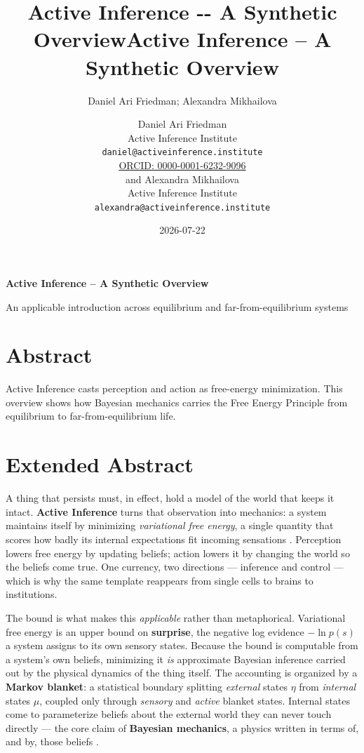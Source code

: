 \documentclass[
  english,
]{article}
\title{Active Inference -\/- A Synthetic Overview}
\author{Daniel Ari Friedman; Alexandra Mikhailova}
\date{}
\title{Active Inference -- A Synthetic Overview}
\author{Daniel Ari Friedman\\\footnotesize{Active Inference Institute}\\\footnotesize{\texttt{daniel@activeinference.institute}}\\\footnotesize{\href{https://orcid.org/0000-0001-6232-9096}{ORCID: 0000-0001-6232-9096}} \\and Alexandra Mikhailova\\\footnotesize{Active Inference Institute}\\\footnotesize{\texttt{alexandra@activeinference.institute}}}
\date{2026-07-22}
\begin{document}
\begin{titlepage}
\centering
\vspace*{2cm}
{\LARGE\bfseries Active Inference -- A Synthetic Overview\par}
\vspace{0.75em}
{\large An applicable introduction across equilibrium and far-from-equilibrium systems\par}
\vfill
\makeatletter
{\@author\par}
\vspace{1em}
{\@date\par}
\makeatother
\vfill
\end{titlepage}
\thispagestyle{empty}
\tableofcontents
\newpage

\section{Abstract}\label{sec:abstract}

Active Inference casts perception and action as free-energy
minimization. This overview shows how Bayesian mechanics carries the
Free Energy Principle from equilibrium to far-from-equilibrium life.

\newpage

\section{Extended Abstract}\label{sec:extended}

A thing that persists must, in effect, hold a model of the world that
keeps it intact. \textbf{Active Inference} turns that observation into
mechanics: a system maintains itself by minimizing \emph{variational
free energy}, a single quantity that scores how badly its internal
expectations fit incoming sensations
\citep{friston2010fep, parr2022active}. Perception lowers free energy by
updating beliefs; action lowers it by changing the world so the beliefs
come true. One currency, two directions --- inference and control ---
which is why the same template reappears from single cells to brains to
institutions.

The bound is what makes this \emph{applicable} rather than metaphorical.
Variational free energy is an upper bound on \textbf{surprise}, the
negative log evidence \(-\ln p(s)\) a system assigns to its own sensory
states. Because the bound is computable from a system's own beliefs,
minimizing it \emph{is} approximate Bayesian inference carried out by
the physical dynamics of the thing itself. The accounting is organized
by a \textbf{Markov blanket}: a statistical boundary splitting
\emph{external} states \(\eta\) from \emph{internal} states \(\mu\),
coupled only through \emph{sensory} and \emph{active} blanket states.
Internal states come to parameterize beliefs about the external world
they can never touch directly --- the core claim of \textbf{Bayesian
mechanics}, a physics written in terms of, and by, those beliefs
\citep{dacosta2021bayesian, ramstead2023bayesian}.
\end{document}
